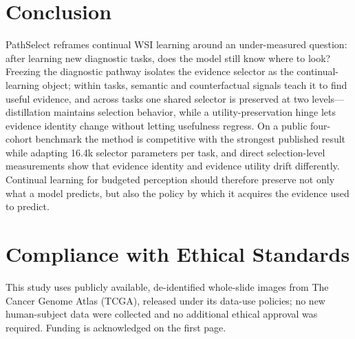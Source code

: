 \documentclass{article}
\begin{document}
\section{Conclusion}

PathSelect reframes continual WSI learning around an under-measured question: after learning new diagnostic tasks, does the model still know where to look? Freezing the diagnostic pathway isolates the evidence selector as the continual-learning object; within tasks, semantic and counterfactual signals teach it to find useful evidence, and across tasks one shared selector is preserved at two levels---distillation maintains selection behavior, while a utility-preservation hinge lets evidence identity change without letting usefulness regress. On a public four-cohort benchmark the method is competitive with the strongest published result while adapting 16.4k selector parameters per task, and direct selection-level measurements show that evidence identity and evidence utility drift differently. Continual learning for budgeted perception should therefore preserve not only what a model predicts, but also the policy by which it acquires the evidence used to predict.

\section*{Compliance with Ethical Standards}
This study uses publicly available, de-identified whole-slide images from The Cancer Genome Atlas (TCGA), released under its data-use policies; no new human-subject data were collected and no additional ethical approval was required. Funding is acknowledged on the first page.



\end{document}

